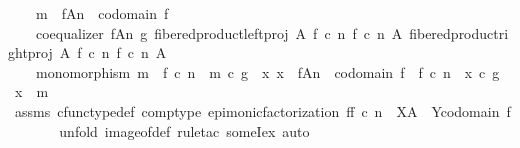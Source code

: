 \begin{isabellebody}
\ \ \ \ m\ {\isacharcolon}{\kern0pt}\ f{\isasymlparr}A{\isasymrparr}\isactrlbsub n\isactrlesub \ {\isasymrightarrow}\ codomain\ f\ {\isasymand}\isanewline
\ \ \ \ coequalizer\ {\isacharparenleft}{\kern0pt}f{\isasymlparr}A{\isasymrparr}\isactrlbsub n\isactrlesub {\isacharparenright}{\kern0pt}\ g\ {\isacharparenleft}{\kern0pt}fibered{\isacharunderscore}{\kern0pt}product{\isacharunderscore}{\kern0pt}left{\isacharunderscore}{\kern0pt}proj\ A\ {\isacharparenleft}{\kern0pt}f\ {\isasymcirc}\isactrlsub c\ n{\isacharparenright}{\kern0pt}\ {\isacharparenleft}{\kern0pt}f\ {\isasymcirc}\isactrlsub c\ n{\isacharparenright}{\kern0pt}\ A{\isacharparenright}{\kern0pt}\ {\isacharparenleft}{\kern0pt}fibered{\isacharunderscore}{\kern0pt}product{\isacharunderscore}{\kern0pt}right{\isacharunderscore}{\kern0pt}proj\ A\ {\isacharparenleft}{\kern0pt}f\ {\isasymcirc}\isactrlsub c\ n{\isacharparenright}{\kern0pt}\ {\isacharparenleft}{\kern0pt}f\ {\isasymcirc}\isactrlsub c\ n{\isacharparenright}{\kern0pt}\ A{\isacharparenright}{\kern0pt}\ {\isasymand}\isanewline
\ \ \ \ monomorphism\ m\ {\isasymand}\ f\ {\isasymcirc}\isactrlsub c\ n\ {\isacharequal}{\kern0pt}\ m\ {\isasymcirc}\isactrlsub c\ g\ {\isasymand}\ {\isacharparenleft}{\kern0pt}{\isasymforall}x{\isachardot}{\kern0pt}\ x\ {\isacharcolon}{\kern0pt}\ f{\isasymlparr}A{\isasymrparr}\isactrlbsub n\isactrlesub \ {\isasymrightarrow}\ codomain\ f\ {\isasymlongrightarrow}\ f\ {\isasymcirc}\isactrlsub c\ n\ {\isacharequal}{\kern0pt}\ x\ {\isasymcirc}\isactrlsub c\ g\ {\isasymlongrightarrow}\ x\ {\isacharequal}{\kern0pt}\ m{\isacharparenright}{\kern0pt}{\isachardoublequoteclose}\isanewline
\ \ \ \ \isamarkupfalse%
\ assms\ cfunc{\isacharunderscore}{\kern0pt}type{\isacharunderscore}{\kern0pt}def\ comp{\isacharunderscore}{\kern0pt}type\ epi{\isacharunderscore}{\kern0pt}monic{\isacharunderscore}{\kern0pt}factorization{\isacharbrackleft}{\kern0pt}\ f{\isacharequal}{\kern0pt}{\isachardoublequoteopen}f\ {\isasymcirc}\isactrlsub c\ n{\isachardoublequoteclose}{\isacharcomma}{\kern0pt}\ \ X{\isacharequal}{\kern0pt}A{\isacharcomma}{\kern0pt}\ \ Y{\isacharequal}{\kern0pt}{\isachardoublequoteopen}codomain\ f{\isachardoublequoteclose}{\isacharbrackright}{\kern0pt}\ \isanewline
\ \ \ \ \isamarkupfalse%
\ {\isacharparenleft}{\kern0pt}unfold\ image{\isacharunderscore}{\kern0pt}of{\isacharunderscore}{\kern0pt}def{\isacharcomma}{\kern0pt}\ rule{\isacharunderscore}{\kern0pt}tac\ someI{\isacharunderscore}{\kern0pt}ex{\isacharcomma}{\kern0pt}\ auto{\isacharparenright}{\kern0pt}\isanewline

\end{isabellebody}
